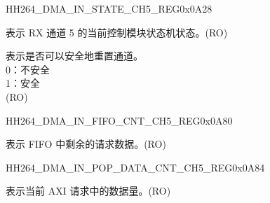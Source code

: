     
    \begin{register}{H}{H264\_DMA\_IN\_STATE\_CH5\_REG}{0x0A28}\label{regdesc:H264DMAINSTATECH5REG}
    \regnewline%
    \begin{regdesc}\begin{reglist}
    \label{fielddesc:H264DMAINSTATECH5}\item [H264\_DMA\_IN\_STATE\_CH5] 表示 RX 通道 5 的当前控制模块状态机状态。(RO)
    \label{fielddesc:H264DMAINRESETAVAILCH5}\item [H264\_DMA\_IN\_RESET\_AVAIL\_CH5] 表示是否可以安全地重置通道。
    \\0：不安全
    \\1：安全\\ (RO)
    \end{reglist}\end{regdesc}
    \end{register}
    
    \begin{register}{H}{H264\_DMA\_IN\_FIFO\_CNT\_CH5\_REG}{0x0A80}\label{regdesc:H264DMAINFIFOCNTCH5REG}
    \regnewline%
    \begin{regdesc}\begin{reglist}
    \label{fielddesc:H264DMAINCMDFIFOINFIFOCNTCH5}\item [H264\_DMA\_IN\_CMDFIFO\_INFIFO\_CNT\_CH5] 表示 FIFO 中剩余的请求数据。(RO)
    \end{reglist}\end{regdesc}
    \end{register}
    
    
    \begin{register}{H}{H264\_DMA\_IN\_POP\_DATA\_CNT\_CH5\_REG}{0x0A84}\label{regdesc:H264DMAINPOPDATACNTCH5REG}
    \regnewline%
    \begin{regdesc}\begin{reglist}
    \label{fielddesc:H264DMAINCMDFIFOPOPDATACNTCH5}\item [H264\_DMA\_IN\_CMDFIFO\_POP\_DATA\_CNT\_CH5] 表示当前 AXI 请求中的数据量。(RO)
    \end{reglist}\end{regdesc}
    \end{register}
    
